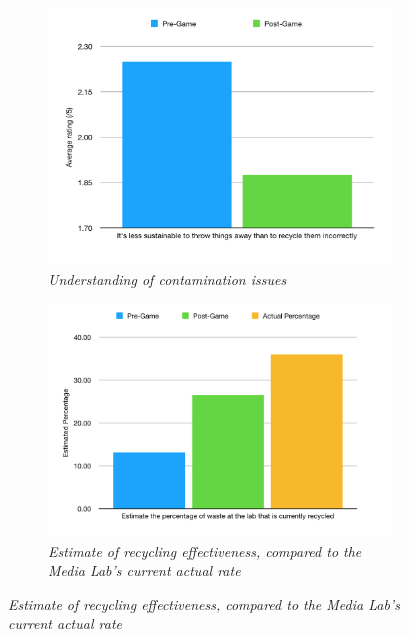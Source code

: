 \documentclass[nofonts,nols,justified,nobib]{tufte-book}
\begin{document}
\begin{figure}
\begin{subfigure}{1\textwidth}
  \centering
  \includegraphics[width=1\linewidth]{img/4/contamination.png}
\caption{\textit{Understanding of contamination issues}}
\end{subfigure}
\vspace{1cm}
\begin{subfigure}{1\textwidth}
  \centering
  \includegraphics[width=1\linewidth]{img/4/recyclingestimate2.png}
\caption{\textit{Estimate of recycling effectiveness, compared to the Media Lab's current actual rate}}
\end{subfigure}%
\end{figure}
\vspace{0.8cm}
\end{document}
